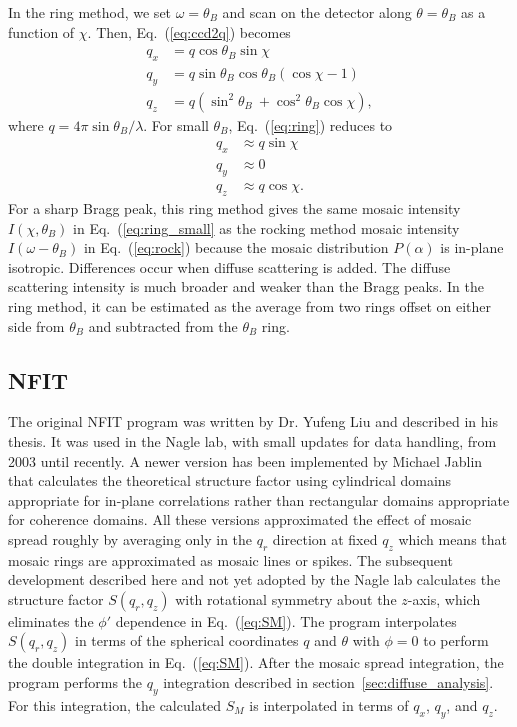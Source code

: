 In the ring method, we set $\omega=\theta_B$ and scan on the detector
along $\theta=\theta_B$ as a function of $\chi$. 
Then, Eq.~(\ref{eq:ccd2q}) becomes
\begin{align}
  q_x &= q\cos\theta_B\sin\chi \nonumber\\
  q_y &= q\sin\theta_B\cos\theta_B(\cos\chi-1) \nonumber\\
  q_z &= q(\sin^2\theta_B\ + \cos^2\theta_B\cos\chi),
  \label{eq:ring}
\end{align}
where $q=4\pi\sin\theta_B/\lambda$. For small $\theta_B$, Eq.~(\ref{eq:ring})
reduces to
\begin{align}
  q_x &\approx q\sin\chi \nonumber\\
  q_y &\approx 0 \nonumber\\
  q_z &\approx q\cos\chi.
  \label{eq:ring_small}
\end{align}
For a sharp Bragg peak, this ring method gives the same mosaic intensity 
$I(\chi,\theta_B)$ in Eq.~(\ref{eq:ring_small} as the rocking method mosaic 
intensity $I(\omega - \theta_B)$ in Eq.~(\ref{eq:rock}) because the mosaic 
distribution $P(\alpha)$ is in-plane isotropic. Differences occur when diffuse 
scattering is added.  The diffuse scattering intensity is much broader and weaker 
than the Bragg peaks.  In the ring method, it can be estimated as the average 
from two rings offset on either side from $\theta_B$ and subtracted from the 
$\theta_B$ ring.

\subsection{NFIT}
The original NFIT program was written by Dr. Yufeng Liu and described in his thesis.  
It was used in the Nagle lab, with small updates for data handling, from 2003 until recently.
A newer version has been implemented by Michael Jablin that calculates the theoretical structure factor using 
cylindrical domains appropriate for in-plane correlations \cite{Lyatskaya01}
rather than rectangular domains appropriate for coherence domains. 
All these versions approximated the effect of mosaic spread roughly by averaging 
only in the $q_r$ direction at fixed $q_z$ which means that mosaic rings are approximated 
as mosaic lines or spikes. The subsequent development described here and not yet adopted 
by the Nagle lab calculates the structure factor $S(q_r,q_z)$ with rotational symmetry 
about the $z$-axis, which eliminates the $\phi'$ dependence in Eq.~(\ref{eq:SM}). 
The program interpolates $S(q_r,q_z)$ in terms
of the spherical coordinates $q$ and $\theta$ with $\phi=0$ 
to perform the double integration in Eq.~(\ref{eq:SM}). 
After the mosaic spread integration, the program performs the $q_y$ integration
described in section~\ref{sec:diffuse_analysis}.
For this integration, the calculated $S_M$ is interpolated 
in terms of $q_x$, $q_y$, and $q_z$.

